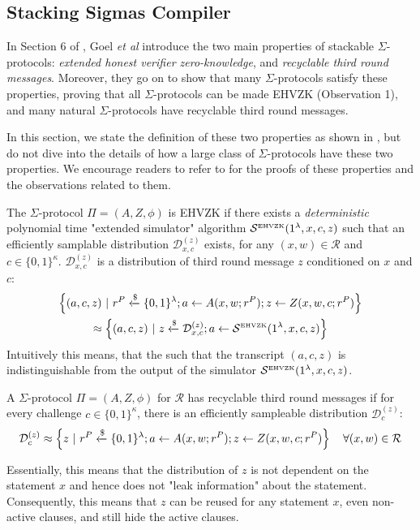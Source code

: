 \subsection{Stacking Sigmas Compiler}
In Section 6 of \cite{StackingSigmas}, Goel \emph{et al} introduce the two main properties of stackable $\Sigma$-protocols: \textit{extended honest verifier 
zero-knowledge}, and \textit{recyclable third round messages}. Moreover, they go on to show that many $\Sigma$-protocols satisfy these properties, 
proving that all $\Sigma$-protocols can be made EHVZK (Observation 1), and many natural $\Sigma$-protocols have recyclable third round messages. 

In this section, we state the definition of these two properties as shown in \cite{StackingSigmas}, but do not dive into the details of how a large class of 
$\Sigma$-protocols have these two properties. We encourage readers to refer to \cite{StackingSigmas} for the proofs of these properties and the observations 
related to them.

\begin{definition}
  The $\Sigma$-protocol $\Pi = (A, Z, \phi)$ is EHVZK if there exists a \textit{deterministic} polynomial time "extended simulator" algorithm 
  $\mathcal S^{\text{\tiny EHVZK}}(1^\lambda, x, c, z)$ such that an efficiently samplable distribution 
  $\mathcal D_{x,c}^{(z)}$ exists, for any $(x,w) \in \mathcal R$ and $c \in \{0,1\}^\kappa$. 
  $\mathcal D_{x,c}^(z)$ is a distribution of third round message $z$ conditioned on $x$ and $c$:
  \begin{multline*}
    \left\{
      (a,c,z) \ \vert\  r^P \xleftarrow{\$} \{0,1\}^\lambda; a \leftarrow A(x, w; r^P); z \leftarrow Z(x,w,c; r^P)
    \right\} \\
    \approx
    \left\{
      (a,c,z) \ \vert\  z \xleftarrow{\$} \mathcal D_{x,c}^{(z)}; a \leftarrow \mathcal S^{\text{\tiny EHVZK}}(1^\lambda, x, c, z)
    \right\}
  \end{multline*}
  Intuitively this means, that the such that the transcript $(a,c,z)$ is indistinguishable from the output of the simulator
  $\mathcal S^{\text{\tiny EHVZK}}(1^\lambda, x, c, z)$.
\end{definition}

\begin{definition}
  A $\Sigma$-protocol $\Pi = (A, Z, \phi)$ for $\mathcal R$ has recyclable third round messages if for every challenge $c \in \{0,1\}^\kappa$, there is an 
  efficiently sampleable distribution $\mathcal D_c^{(z)}$:
  $$
    \mathcal D_c^{(z)} \approx \left\{z \ \vert\  r^P \xleftarrow{\$} \{0,1\}^\lambda; a \leftarrow A(x,w;r^P); z \leftarrow Z(x,w,c;r^P) \right\}\quad 
    \forall (x,w) \in \mathcal R 
  $$
\end{definition}
  Essentially, this means that the distribution of $z$ is not dependent on the statement $x$ and hence does not "leak information" about the statement. 
  Consequently, this means that $z$ can be reused for any statement $x$, even non-active clauses, and still hide the active clauses. 

